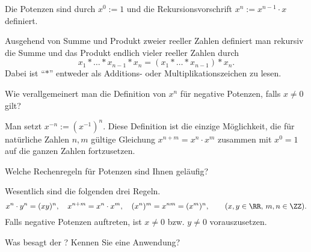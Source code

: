 \begin{antwort}
  Die Potenzen sind durch 
  $x^0 := 1$ und die Rekursionsvorschrift
  $x^{n} := x^{n-1} \cdot x$ definiert.

  Ausgehend von Summe und Produkt zweier reeller Zahlen 
  definiert man rekursiv die Summe und das Produkt endlich vieler 
  reeller Zahlen durch 
  \[
  x_1 \ast \ldots \ast x_{n-1} \ast x_n = (x_1 \ast \ldots \ast x_{n-1}) 
  \ast x_n. 
  \]
  Dabei ist "`$\ast$"' entweder als Additions- oder Multiplikationszeichen 
  zu lesen.
  \AntEnd
\end{antwort}






\begin{frage}
  Wie verallgemeinert man die Definition von $x^n$ für negative 
  Potenzen, falls $x\not=0$ gilt?
\end{frage}

\begin{antwort}
  Man setzt $x^{-n} := (x^{-1})^n.$ 
  Diese Definition ist die einzige Möglichkeit, die 
  für natürliche Zahlen $n,m$ gültige Gleichung  
  $x^{n+m}=x^n\cdot x^m$ zusammen mit $x^0=1$ auf die ganzen 
  Zahlen fortzusetzen.
  \AntEnd
\end{antwort}






\begin{frage}
  Welche Rechenregeln für Potenzen sind Ihnen geläufig?
\end{frage}

\begin{antwort}
  Wesentlich sind die folgenden drei Regeln. 
  \[
  x^n \cdot y^n = (xy)^n, \quad x^{n+m} =x^n\cdot x^m, 
  \quad (x^n)^m= x^{nm} = (x^m)^n, 
  \qquad (x,y\in\RR,\, m,n \in \ZZ).
  \]
  Falls negative Potenzen auftreten, ist $x\not=0$ bzw. $y\not=0$ 
  vorauszusetzen.
  \AntEnd
\end{antwort}






\begin{frage}
  \label{01_reks}
  Was besagt der ? 
  Kennen Sie eine Anwendung?
\end{frage} 

